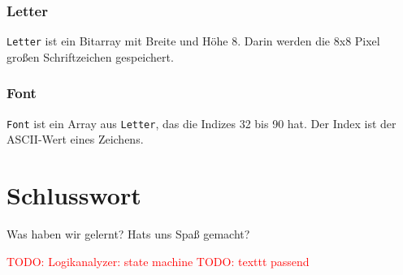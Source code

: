 \documentclass[IN,ngerman,utf8,12pt]{tumbook}
\newcommand\todo[1]{\textcolor{red}{TODO: #1}}
\begin{document}
\subsection{Letter}
\label{kap:letter}
\texttt{Letter} ist ein Bitarray mit Breite und Höhe 8.
Darin werden die 8x8 Pixel großen Schriftzeichen gespeichert.

\subsection{Font}
\label{kap:font}
\texttt{Font} ist ein Array aus \texttt{Letter}, das die Indizes 32 bis 90 hat.
Der Index ist der ASCII-Wert eines Zeichens.

\chapter{Schlusswort}
Was haben wir gelernt? Hats uns Spaß gemacht?

\todo{Logikanalyzer: state machine}
\todo{texttt passend}


\clearpage
\appendix%
\listoffigures%
\end{document}
